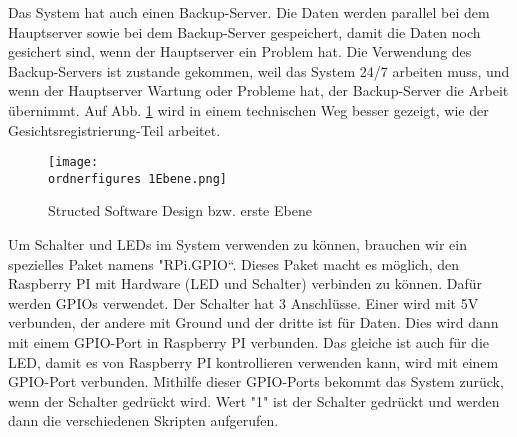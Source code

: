Das System hat auch einen Backup-Server. Die Daten werden parallel bei dem Hauptserver sowie bei dem Backup-Server gespeichert, damit die Daten noch gesichert sind, wenn der Hauptserver ein Problem hat. Die Verwendung des Backup-Servers ist zustande gekommen, weil das System 24/7 arbeiten muss, und wenn der Hauptserver Wartung oder Probleme hat, der Backup-Server die Arbeit \"ubernimmt. Auf Abb. \ref{fig:1Ebene_Gesichtsregistrierung} wird in einem technischen Weg besser gezeigt, wie der Gesichtsregistrierung-Teil arbeitet.

\begin{figure}[H]
	\texttt{[image: \\ordnerfigures 1Ebene.png]}
	\caption{Structed Software Design bzw. erste Ebene }
	\label{fig:1Ebene_Gesichtsregistrierung}
\end{figure}
Um Schalter und LEDs im System verwenden zu k\"onnen, brauchen wir ein spezielles Paket namens "RPi.GPIO“. Dieses Paket macht es m\"oglich, den Raspberry PI mit Hardware (LED und Schalter) verbinden zu k\"onnen. Daf\"ur werden GPIOs verwendet. Der Schalter hat 3 Anschl\"usse. Einer wird mit 5V verbunden, der andere mit Ground und der dritte ist f\"ur Daten. Dies wird dann mit einem GPIO-Port in Raspberry PI verbunden. Das gleiche ist auch f\"ur die LED, damit es von Raspberry PI kontrollieren verwenden kann, wird mit einem GPIO-Port verbunden. Mithilfe dieser GPIO-Ports bekommt das System zur\"uck, wenn der Schalter gedr\"uckt wird. Wert "1" ist der Schalter gedr\"uckt und werden dann die verschiedenen Skripten aufgerufen. 

